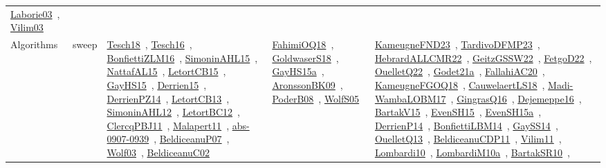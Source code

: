 {\begin{longtable}{lp{3cm}>{\raggedright\arraybackslash}p{6cm}>{\raggedright\arraybackslash}p{6cm}>{\raggedright\arraybackslash}p{8cm}}
\href{works/Laborie03.pdf}{Laborie03}~\cite{Laborie03}, \href{works/Vilim03.pdf}{Vilim03}~\cite{Vilim03}\\
Algorithms & sweep & \href{works/Tesch18.pdf}{Tesch18}~\cite{Tesch18}, \href{works/Tesch16.pdf}{Tesch16}~\cite{Tesch16}, \href{works/BonfiettiZLM16.pdf}{BonfiettiZLM16}~\cite{BonfiettiZLM16}, \href{works/SimoninAHL15.pdf}{SimoninAHL15}~\cite{SimoninAHL15}, \href{works/NattafAL15.pdf}{NattafAL15}~\cite{NattafAL15}, \href{works/LetortCB15.pdf}{LetortCB15}~\cite{LetortCB15}, \href{works/GayHS15.pdf}{GayHS15}~\cite{GayHS15}, \href{works/Derrien15.pdf}{Derrien15}~\cite{Derrien15}, \href{works/DerrienPZ14.pdf}{DerrienPZ14}~\cite{DerrienPZ14}, \href{works/LetortCB13.pdf}{LetortCB13}~\cite{LetortCB13}, \href{works/SimoninAHL12.pdf}{SimoninAHL12}~\cite{SimoninAHL12}, \href{works/LetortBC12.pdf}{LetortBC12}~\cite{LetortBC12}, \href{works/ClercqPBJ11.pdf}{ClercqPBJ11}~\cite{ClercqPBJ11}, \href{works/Malapert11.pdf}{Malapert11}~\cite{Malapert11}, \href{works/abs-0907-0939.pdf}{abs-0907-0939}~\cite{abs-0907-0939}, \href{works/BeldiceanuP07.pdf}{BeldiceanuP07}~\cite{BeldiceanuP07}, \href{works/Wolf03.pdf}{Wolf03}~\cite{Wolf03}, \href{works/BeldiceanuC02.pdf}{BeldiceanuC02}~\cite{BeldiceanuC02} & \href{works/FahimiOQ18.pdf}{FahimiOQ18}~\cite{FahimiOQ18}, \href{works/GoldwaserS18.pdf}{GoldwaserS18}~\cite{GoldwaserS18}, \href{works/GayHS15a.pdf}{GayHS15a}~\cite{GayHS15a}, \href{works/AronssonBK09.pdf}{AronssonBK09}~\cite{AronssonBK09}, \href{works/PoderB08.pdf}{PoderB08}~\cite{PoderB08}, \href{works/WolfS05.pdf}{WolfS05}~\cite{WolfS05} & \href{works/KameugneFND23.pdf}{KameugneFND23}~\cite{KameugneFND23}, \href{works/TardivoDFMP23.pdf}{TardivoDFMP23}~\cite{TardivoDFMP23}, \href{works/HebrardALLCMR22.pdf}{HebrardALLCMR22}~\cite{HebrardALLCMR22}, \href{works/GeitzGSSW22.pdf}{GeitzGSSW22}~\cite{GeitzGSSW22}, \href{works/FetgoD22.pdf}{FetgoD22}~\cite{FetgoD22}, \href{works/OuelletQ22.pdf}{OuelletQ22}~\cite{OuelletQ22}, \href{works/Godet21a.pdf}{Godet21a}~\cite{Godet21a}, \href{works/FallahiAC20.pdf}{FallahiAC20}~\cite{FallahiAC20}, \href{works/KameugneFGOQ18.pdf}{KameugneFGOQ18}~\cite{KameugneFGOQ18}, \href{works/CauwelaertLS18.pdf}{CauwelaertLS18}~\cite{CauwelaertLS18}, \href{works/Madi-WambaLOBM17.pdf}{Madi-WambaLOBM17}~\cite{Madi-WambaLOBM17}, \href{works/GingrasQ16.pdf}{GingrasQ16}~\cite{GingrasQ16}, \href{works/Dejemeppe16.pdf}{Dejemeppe16}~\cite{Dejemeppe16}, \href{works/BartakV15.pdf}{BartakV15}~\cite{BartakV15}, \href{works/EvenSH15.pdf}{EvenSH15}~\cite{EvenSH15}, \href{works/EvenSH15a.pdf}{EvenSH15a}~\cite{EvenSH15a}, \href{works/DerrienP14.pdf}{DerrienP14}~\cite{DerrienP14}, \href{works/BonfiettiLBM14.pdf}{BonfiettiLBM14}~\cite{BonfiettiLBM14}, \href{works/GaySS14.pdf}{GaySS14}~\cite{GaySS14}, \href{works/OuelletQ13.pdf}{OuelletQ13}~\cite{OuelletQ13}, \href{works/BeldiceanuCDP11.pdf}{BeldiceanuCDP11}~\cite{BeldiceanuCDP11}, \href{works/Vilim11.pdf}{Vilim11}~\cite{Vilim11}, \href{works/Lombardi10.pdf}{Lombardi10}~\cite{Lombardi10}, \href{works/LombardiM10a.pdf}{LombardiM10a}~\cite{LombardiM10a}, \href{works/BartakSR10.pdf}{BartakSR10}~\cite{BartakSR10}, 
\end{longtable}}
